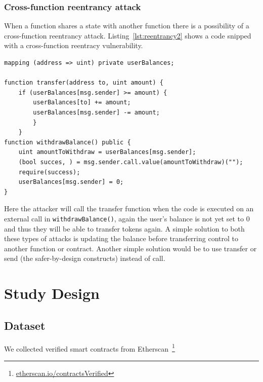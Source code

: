 \documentclass[10pt,conference]{IEEEtran}
\begin{document}
\subsubsection{Cross-function reentrancy attack}
When a function shares a state with another function there is a possibility of a cross-function reentrancy attack.  Listing~\ref{lst:reentrancy2}  shows a code snipped with a cross-function reentracy vulnerability. 
\begin{lstlisting}[language=Solidity, caption=Cross-function reentrancy attack, label=lst:reentrancy2]
mapping (address => uint) private userBalances;

function transfer(address to, uint amount) {
    if (userBalances[msg.sender] >= amount) {
        userBalances[to] += amount;
        userBalances[msg.sender] -= amount;
        }
    }
function withdrawBalance() public {
    uint amountToWithdraw = userBalances[msg.sender];
    (bool succes, ) = msg.sender.call.value(amountToWithdraw)("");
    require(success);
    userBalances[msg.sender] = 0;
}

\end{lstlisting}
Here the attacker will call the transfer function when the code is executed on an external call in \texttt{withdrawBalance()},  again the user's balance is not yet set to 0 and thus they will be able to transfer tokens again. A simple solution to both these types of attacks is updating the balance before transferring control to another function or contract.  Another simple solution would be to use transfer or send (the safer-by-design constructs) instead of call.



\section{Study Design}
\subsection{Dataset}

We collected verified smart contracts from Etherscan~\footnote{\url{etherscan.io/contractsVerified}}
\end{document}
